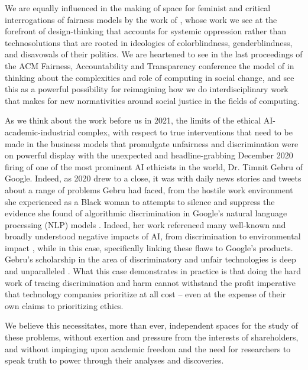\documentclass[11pt]{article}
\begin{document}
We are equally influenced in the making of space for feminist and critical interrogations of fairness models by the work of \cite{hoffmann2019fairness}, whose work we see at the forefront of design-thinking that accounts for systemic oppression rather than technosolutions that are rooted in ideologies of colorblindness, genderblindness, and disavowals of their politics. We are heartened to see in the last proceedings of the ACM Fairness, Accountability and Transparency conference the model of \cite{abebe2020roles} in thinking about the complexities and role of computing in social change, and see this as a powerful possibility for reimagining how we do interdisciplinary work that makes for new normativities around social justice in the fields of computing.


As we think about the work before us in 2021, the limits of the ethical AI-academic-industrial complex, with respect to true interventions that need to be made in the business models that promulgate unfairness and discrimination were on powerful display with the unexpected and headline-grabbing December 2020 firing of one of the most prominent AI ethicists in the world, Dr. Timnit Gebru of Google. Indeed, as 2020 drew to a close, it was with daily news stories and tweets about a range of problems Gebru had faced, from the hostile work environment she experienced as a Black woman to attempts to silence and suppress the evidence she found of algorithmic discrimination in Google’s natural language processing (NLP) models \cite{Hao2020}. Indeed, her work referenced many well-known and broadly understood negative impacts of AI, from discrimination to environmental impact \cite{crawford2019ai}, while in this case, specifically linking these flaws to Google’s products. Gebru’s scholarship in the area of discriminatory and unfair technologies is deep and unparalleled \cite{gebru2019oxford,gebru2018datasheets,buolamwini2018gender}. What this case demonstrates in practice is that doing the hard work of tracing discrimination and harm cannot withstand the profit imperative that technology companies prioritize at all cost -- even at the expense of their own claims to prioritizing ethics. 

We believe this necessitates, more than ever, independent spaces for the study of these problems, without exertion and pressure from the interests of shareholders, and without impinging upon academic freedom and the need for researchers to speak truth to power through their analyses and discoveries. 
\end{document}
